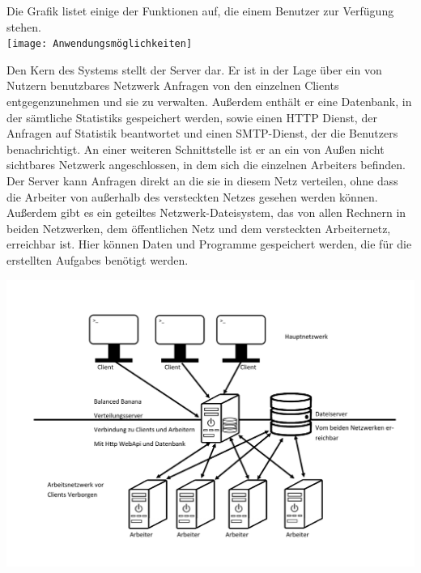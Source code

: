 \documentclass[a4paper,12pt]{article}
\begin{document}
\begin{minipage}[t]{\linewidth}

Die Grafik listet einige der Funktionen auf, die einem \gls{Benutzer} zur Verfügung stehen.\\

\texttt{[image: Anwendungsmöglichkeiten]}

\end {minipage}

\begin{minipage}[t]{\linewidth}

Den Kern des Systems stellt der \gls{Server} dar. Er ist in der Lage über ein von Nutzern benutzbares Netzwerk Anfragen von den einzelnen \glspl{Client} entgegenzunehmen und sie zu verwalten.
Außerdem enthält er eine \gls{Datenbank}, in der sämtliche \glspl{Statistik} gespeichert werden, sowie einen HTTP Dienst, der Anfragen auf \gls{Statistik} beantwortet und einen SMTP-Dienst, der die \glspl{Benutzer} benachrichtigt. An einer weiteren \gls{Schnittstelle} ist er an ein von Außen nicht sichtbares Netzwerk angeschlossen, in dem sich die einzelnen \glspl{Arbeiter} befinden. Der \gls{Server} kann Anfragen direkt an die sie in diesem Netz verteilen, ohne dass die \gls{Arbeiter} von außerhalb des versteckten Netzes gesehen werden können. Außerdem gibt es ein geteiltes Netzwerk-Dateisystem, das von allen Rechnern in beiden Netzwerken, dem öffentlichen Netz und dem versteckten Arbeiternetz, erreichbar ist. Hier können Daten und Programme gespeichert werden, die für die erstellten \glspl{Aufgabe} benötigt werden.

\includegraphics[width=\textwidth]{Systemmodelle/Systemaufbau}

\end{minipage}
\end{document}
